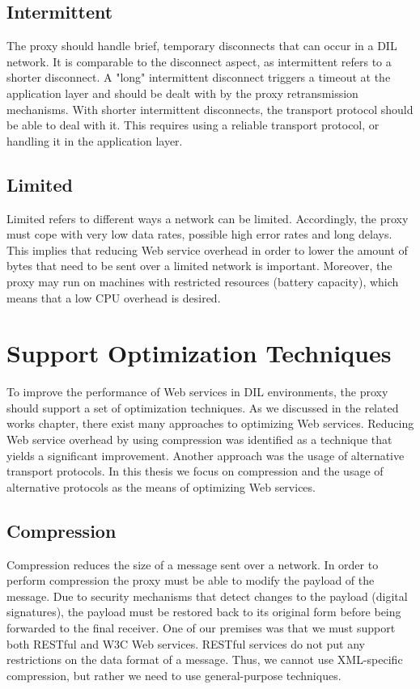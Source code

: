 \subsection{Intermittent}

The proxy should handle brief, temporary disconnects that can occur in a DIL
network. It is comparable to the disconnect aspect, as intermittent refers to a
shorter disconnect. A "long" intermittent disconnect triggers a timeout at the
application layer and should be dealt with by the proxy retransmission
mechanisms. With shorter intermittent disconnects, the transport protocol should
be able to deal with it. This requires using a reliable transport protocol, or
handling it in the application layer.

\subsection{Limited}

Limited refers to different ways a network can be limited. Accordingly, the
proxy must cope with very low data rates, possible high error rates and long
delays. This implies that reducing Web service overhead in order to lower the
amount of bytes that need to be sent over a limited network is important.
Moreover, the proxy may run on machines with restricted resources (battery
capacity), which means that a low CPU overhead is desired.

\section{Support Optimization Techniques}

To improve the performance of Web services in DIL environments, the proxy should
support a set of optimization techniques. As we discussed in the related works
chapter, there exist many approaches to optimizing Web services. Reducing Web
service overhead by using compression was identified as a technique that yields
a significant improvement. Another approach was the usage of alternative
transport protocols. In this thesis we focus on compression and the usage of
alternative protocols as the means of optimizing Web services.

\subsection{Compression}

Compression reduces the size of a message sent over a network. In order to
perform compression the proxy must be able to modify the payload of the message.
Due to security mechanisms that detect changes to the payload (digital
signatures), the payload must be restored back to its original form before being
forwarded to the final receiver. One of our premises was that we must support
both RESTful and W3C Web services. RESTful services do not put any
restrictions on the data format of a message. Thus, we cannot use XML-specific
compression, but rather we need to use general-purpose techniques.

